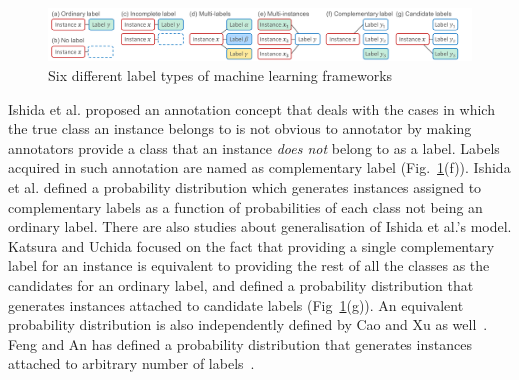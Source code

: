\documentclass[a4paper,conference]{IEEEtran}
\begin{document}
\begin{figure}[t]
\begin{center}
    \includegraphics[width=1.0\textwidth]{figs/diagrams/rw_labels.pdf}
    \caption{Six different label types of machine learning frameworks}
    \label{fig:rw}
\end{center}
\end{figure}

Ishida et al. proposed an annotation concept that deals with the cases in which the true class an instance belongs to is not obvious to annotator by making annotators provide a class that an instance \textit{does not} belong to as a label.
Labels acquired in such annotation are named as complementary label (Fig.~\ref{fig:rw}(f)).
Ishida et al. defined a probability distribution which generates instances assigned to complementary labels as a function of probabilities of each class not being an ordinary label.
There are also studies about generalisation of Ishida et al.'s model.
Katsura and Uchida focused on the fact that providing a single complementary label for an instance is equivalent to providing the rest of all the classes as the candidates for an ordinary label, and defined a probability distribution that generates instances attached to candidate labels (Fig~\ref{fig:rw}(g)).
An equivalent probability distribution is also independently defined by Cao and Xu as well~\cite{Cao:2020}.
Feng and An has defined a probability distribution that generates instances attached to arbitrary number of labels~\cite{Feng:2019}.
\end{document}
